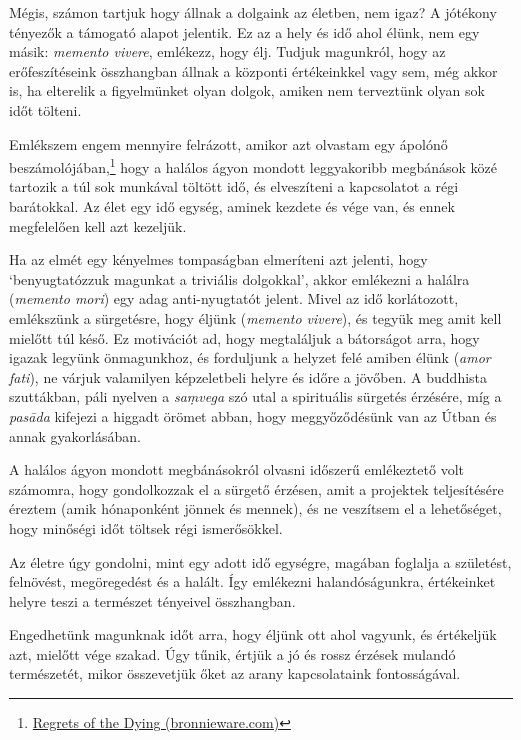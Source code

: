 
\clearpage
\normalpagelayout

Mégis, számon tartjuk hogy állnak a dolgaink az életben, nem igaz? A
jótékony tényezők a támogató alapot jelentik. Ez az a hely és idő ahol
élünk, nem egy másik: \emph{memento vivere}, emlékezz, hogy élj. Tudjuk
magunkról, hogy az erőfeszítéseink összhangban állnak a központi
értékeinkkel vagy sem, még akkor is, ha elterelik a figyelmünket olyan
dolgok, amiken nem terveztünk olyan sok időt tölteni.

Emlékszem engem mennyire felrázott, amikor azt olvastam egy ápolónő
beszámolójában,\footnote{\href{https://bronnieware.com/blog/regrets-of-the-dying/}{Regrets
  of the Dying (bronnieware.com)}} hogy a halálos ágyon mondott
leggyakoribb megbánások közé tartozik a túl sok munkával töltött idő, és
elveszíteni a kapcsolatot a régi barátokkal. Az élet egy idő egység,
aminek kezdete és vége van, és ennek megfelelően kell azt kezeljük.


Ha az elmét egy kényelmes tompaságban elmeríteni azt jelenti, hogy
`benyugtatózzuk magunkat a triviális dolgokkal', akkor emlékezni a
halálra (\emph{memento mori}) egy adag anti-nyugtatót jelent. Mivel az
idő korlátozott, emlékszünk a sürgetésre, hogy éljünk (\emph{memento
vivere}), és tegyük meg amit kell mielőtt túl késő. Ez motivációt ad,
hogy megtaláljuk a bátorságot arra, hogy igazak legyünk önmagunkhoz, és
forduljunk a helyzet felé amiben élünk (\emph{amor fati}), ne várjuk
valamilyen képzeletbeli helyre és időre a jövőben. A buddhista
szuttákban, páli nyelven a \emph{saṃvega} szó utal a spirituális
sürgetés érzésére, míg a \emph{pasāda} kifejezi a higgadt örömet abban,
hogy meggyőződésünk van az Útban és annak gyakorlásában.

A halálos ágyon mondott megbánásokról olvasni időszerű emlékeztető volt
számomra, hogy gondolkozzak el a sürgető érzésen, amit a projektek
teljesítésére éreztem (amik hónaponként jönnek és mennek), és ne
veszítsem el a lehetőséget, hogy minőségi időt töltsek régi
ismerősökkel.

Az életre úgy gondolni, mint egy adott idő egységre, magában foglalja a
születést, felnövést, megöregedést és a halált. Így emlékezni
halandóságunkra, értékeinket helyre teszi a természet tényeivel
összhangban.

Engedhetünk magunknak időt arra, hogy éljünk ott ahol vagyunk, és
értékeljük azt, mielőtt vége szakad. Úgy tűnik, értjük a jó és rossz
érzések mulandó természetét, mikor összevetjük őket az arany
kapcsolataink fontosságával.

